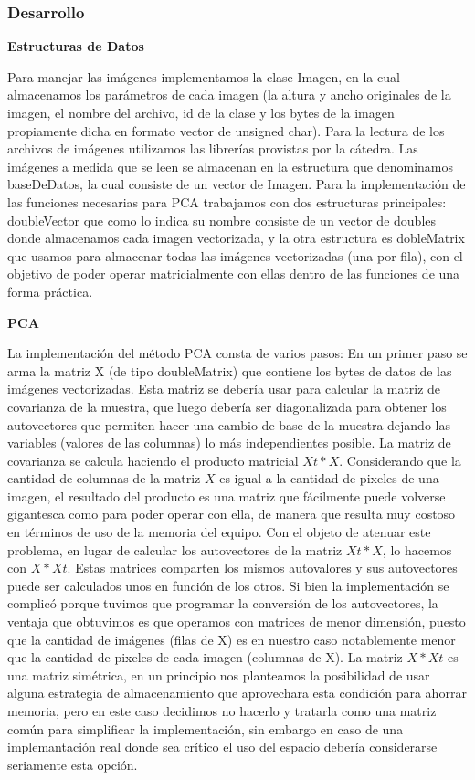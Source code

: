 \subsubsection*{Desarrollo}
\textbf{Estructuras de Datos}

Para manejar las imágenes implementamos la clase Imagen, en la cual almacenamos los parámetros de cada imagen (la altura y ancho originales de la imagen, el nombre del archivo, id de la clase y los bytes de la imagen propiamente dicha en formato vector de unsigned char).
Para la lectura de los archivos de imágenes utilizamos las librerías provistas por la cátedra.
Las imágenes a medida que se leen se almacenan en la estructura que denominamos baseDeDatos, la cual consiste de un vector de Imagen.
Para la implementación de las funciones necesarias para PCA trabajamos con dos estructuras principales: doubleVector que como lo indica su nombre consiste de un vector de doubles donde almacenamos cada imagen vectorizada, y la otra estructura es dobleMatrix que usamos para almacenar todas las imágenes vectorizadas (una por fila), con el objetivo de poder operar matricialmente con ellas dentro de las funciones de una forma práctica.


\textbf{PCA}

La implementación del método PCA consta de varios pasos:
En un primer paso se arma la matriz X (de tipo doubleMatrix) que contiene los bytes de datos de las imágenes vectorizadas. Esta matriz se debería usar para calcular la matriz de covarianza de la muestra, que luego debería ser diagonalizada para obtener los autovectores que permiten hacer una cambio de base de la muestra dejando las variables (valores de las columnas) lo más independientes posible.
La matriz de covarianza se calcula haciendo el producto matricial $X{t} * X$. Considerando que la cantidad de columnas de la matriz $X$ es igual a la cantidad de pixeles de una imagen, el resultado del producto es una matriz que fácilmente puede volverse gigantesca como para poder operar con ella, de manera que resulta muy costoso en términos de uso de la memoria del equipo. Con el objeto de atenuar este problema, en lugar de calcular los autovectores de la matriz $X{t} * X$, lo hacemos con $X * X{t}$. Estas matrices comparten los mismos autovalores y sus autovectores puede ser calculados unos en función de los otros. Si bien la implementación se complicó porque tuvimos que programar la conversión de los autovectores, la ventaja que obtuvimos es que operamos con matrices de menor dimensión, puesto que la cantidad de imágenes (filas de X) es en nuestro caso notablemente menor que la cantidad de pixeles de cada imagen (columnas de X).
La matriz $X * X{t}$ es una matriz simétrica, en un principio nos planteamos la posibilidad de usar alguna estrategia de almacenamiento que aprovechara esta condición para ahorrar memoria, pero en este caso decidimos no hacerlo y tratarla como una matriz común para simplificar la implementación, sin embargo en caso de una implemantación real donde sea crítico el uso del espacio debería considerarse seriamente esta opción.

